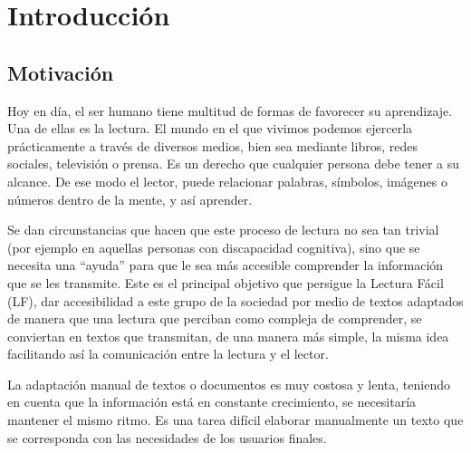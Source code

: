 \chapter{Introducción}
\label{cap:introduccion}


\section{Motivación}
Hoy en día, el ser humano tiene multitud de formas de favorecer su aprendizaje. Una de ellas es la lectura. El mundo en el que vivimos podemos ejercerla prácticamente a través de diversos medios, bien sea mediante libros, redes sociales, televisión o prensa. Es un derecho que cualquier persona debe tener a su alcance. De ese modo el lector, puede relacionar palabras, símbolos, imágenes o números dentro de la mente, y así aprender.


 \setlength{\parskip}{10pt}

 Se dan circunstancias que hacen que este proceso de lectura no sea tan trivial (por ejemplo en aquellas personas con discapacidad cognitiva), sino que se necesita una ``ayuda'' para que le sea más accesible comprender la información que se les transmite. Este es el principal objetivo que persigue la Lectura Fácil (LF), dar accesibilidad a este grupo de la sociedad por medio de textos adaptados de manera que una lectura que perciban como compleja de comprender, se conviertan en textos que transmitan, de una manera más simple, la misma idea facilitando así la comunicación entre la lectura y el lector.
 
 \setlength{\parskip}{10pt}
 
 

 
La adaptación manual de textos o documentos es muy costosa y lenta, teniendo en cuenta que la información está en constante crecimiento, se necesitaría mantener el mismo ritmo. Es una tarea difícil elaborar manualmente un texto que se corresponda con las necesidades de los usuarios finales. 
 
 
